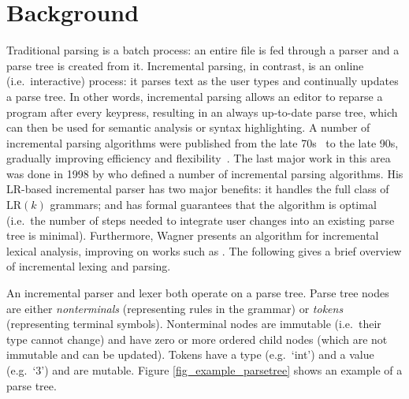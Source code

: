 \documentclass[sigplan,screen]{acmart}\settopmatter{printfolios=true,printccs=false,printacmref=false}
\begin{document}
\section{Background}
\label{sec_background}

Traditional parsing is a batch process: an entire file is fed through a parser
and a parse tree is created from it. Incremental parsing, in contrast, is an
online (i.e.~interactive) process: it parses text as the user types and
continually updates a parse tree.  In other words, incremental parsing allows
an editor to reparse a program after every keypress, resulting in an always
up-to-date parse tree, which can then be used for semantic analysis or syntax
highlighting.  A number of incremental parsing algorithms were published from
the late 70s~\cite{ghezzi79incremental, jalili82building, larcheveque95optimal,
petrone95reusing} to the late 90s, gradually improving efficiency and
flexibility~\cite{li97new,ferro94efficient}.  The last major work in this area
was done in 1998 by \cite{wagner98practicalalgorithms} who defined a number of
incremental parsing algorithms. His LR-based incremental parser has two major
benefits: it handles the full class of $\textrm{LR}(k)$ grammars; and has
formal guarantees that the algorithm is optimal (i.e.~the number of steps
needed to integrate user changes into an existing parse tree is minimal).
Furthermore, Wagner presents an algorithm for incremental lexical analysis,
improving on works such as \cite{fischer84poe, bahlke86psg, ballance92pan,
fischer92aladin}. The following gives a brief overview of incremental lexing
and parsing.

An incremental parser and lexer both operate on a parse tree. Parse tree nodes
are either \emph{nonterminals} (representing rules in the grammar) or
\emph{tokens} (representing terminal symbols). Nonterminal nodes are immutable
(i.e.~their type cannot change) and have zero or more ordered child nodes
(which are not immutable and can be updated). Tokens have a type (e.g.~`int')
and a value (e.g.~`3') and are mutable. Figure \ref{fig_example_parsetree}
shows an example of a parse tree.
\end{document}
